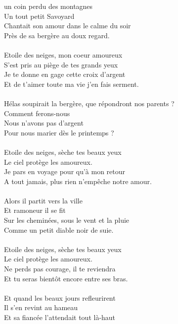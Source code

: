 
 un coin perdu des montagnes
\\Un tout petit Savoyard
\\Chantait son amour dans le calme du soir
\\Près de sa bergère au doux regard.
\\\\Etoile des neiges, mon coeur amoureux
\\S'est pris au piège de tes grands yeux
\\Je te donne en gage cette croix d'argent
\\Et de t'aimer toute ma vie j'en fais serment.
\\\\Hélas soupirait la bergère, que répondront nos parents ?
\\Comment ferons-nous
\\Nous n'avons pas d'argent
\\Pour nous marier dès le printemps ?
\\\\Etoile des neiges, sèche tes beaux yeux
\\Le ciel protège les amoureux.
\\Je pars en voyage pour qu'à mon retour
\\A tout jamais, plus rien n'empêche notre amour.
\\\\Alors il partit vers la ville
\\Et ramoneur il se fit
\\Sur les cheminées, sous le vent et la pluie
\\Comme un petit diable noir de suie.
\\\\Etoile des neiges, sèche tes beaux yeux
\\Le ciel protège les amoureux.
\\Ne perds pas courage, il te reviendra
\\Et tu seras bientôt encore entre ses bras.
\\\\Et quand les beaux jours refleurirent
\\Il s'en revint au hameau
\\Et sa fiancée l'attendait tout là-haut

